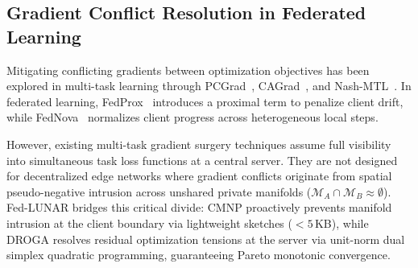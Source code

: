 \subsection{Gradient Conflict Resolution in Federated Learning}
\label{subsec:gradient_conflict_literature}

Mitigating conflicting gradients between optimization objectives has been explored in multi-task learning through PCGrad~\cite{yu2020gradient}, CAGrad~\cite{liu2021conflict}, and Nash-MTL~\cite{navon2022multi}. In federated learning, FedProx~\cite{li2020federated} introduces a proximal term to penalize client drift, while FedNova~\cite{wang2020tackling} normalizes client progress across heterogeneous local steps. 

However, existing multi-task gradient surgery techniques assume full visibility into simultaneous task loss functions at a central server. They are not designed for decentralized edge networks where gradient conflicts originate from spatial pseudo-negative intrusion across unshared private manifolds ($\mathcal{M}_A \cap \mathcal{M}_B \approx \emptyset$). Fed-LUNAR bridges this critical divide: CMNP proactively prevents manifold intrusion at the client boundary via lightweight sketches ($<5$\,KB), while DROGA resolves residual optimization tensions at the server via unit-norm dual simplex quadratic programming, guaranteeing Pareto monotonic convergence.

